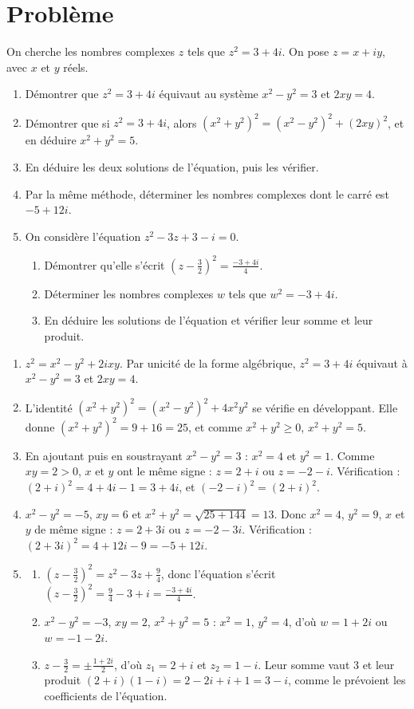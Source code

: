 \mxnewpage
\section{Problème}
\begin{problem}
On cherche les nombres complexes $z$ tels que $z^2=3+4i$. On pose $z=x+iy$, avec $x$ et $y$ réels.
\begin{enumerate}
\item Démontrer que $z^2=3+4i$ équivaut au système $x^2-y^2=3$ et $2xy=4$.
\item Démontrer que si $z^2=3+4i$, alors $\left(x^2+y^2\right)^2=\left(x^2-y^2\right)^2+(2xy)^2$, et en déduire $x^2+y^2=5$.
\item En déduire les deux solutions de l'équation, puis les vérifier.
\item Par la même méthode, déterminer les nombres complexes dont le carré est $-5+12i$.
\item On considère l'équation $z^2-3z+3-i=0$.
\begin{enumerate}
\item Démontrer qu'elle s'écrit $\left(z-\frac32\right)^2=\frac{-3+4i}{4}$.
\item Déterminer les nombres complexes $w$ tels que $w^2=-3+4i$.
\item En déduire les solutions de l'équation et vérifier leur somme et leur produit.
\end{enumerate}
\end{enumerate}
\end{problem}
\begin{solution}[Problème]
\begin{enumerate}
\item $z^2=x^2-y^2+2ixy$. Par unicité de la forme algébrique, $z^2=3+4i$ équivaut à $x^2-y^2=3$ et $2xy=4$.
\item L'identité $\left(x^2+y^2\right)^2=\left(x^2-y^2\right)^2+4x^2y^2$ se vérifie en développant. Elle donne $\left(x^2+y^2\right)^2=9+16=25$, et comme $x^2+y^2\ge0$, $x^2+y^2=5$.
\item En ajoutant puis en soustrayant $x^2-y^2=3$ : $x^2=4$ et $y^2=1$. Comme $xy=2>0$, $x$ et $y$ ont le même signe : $z=2+i$ ou $z=-2-i$. Vérification : $(2+i)^2=4+4i-1=3+4i$, et $(-2-i)^2=(2+i)^2$.
\item $x^2-y^2=-5$, $xy=6$ et $x^2+y^2=\sqrt{25+144}=13$. Donc $x^2=4$, $y^2=9$, $x$ et $y$ de même signe : $z=2+3i$ ou $z=-2-3i$. Vérification : $(2+3i)^2=4+12i-9=-5+12i$.
\item
\begin{enumerate}
\item $\left(z-\frac32\right)^2=z^2-3z+\frac94$, donc l'équation s'écrit $\left(z-\frac32\right)^2=\frac94-3+i=\frac{-3+4i}{4}$.
\item $x^2-y^2=-3$, $xy=2$, $x^2+y^2=5$ : $x^2=1$, $y^2=4$, d'où $w=1+2i$ ou $w=-1-2i$.
\item $z-\frac32=\pm\frac{1+2i}{2}$, d'où $z_1=2+i$ et $z_2=1-i$. Leur somme vaut $3$ et leur produit $(2+i)(1-i)=2-2i+i+1=3-i$, comme le prévoient les coefficients de l'équation.
\end{enumerate}
\end{enumerate}
\end{solution}

